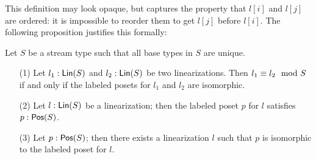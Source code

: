 This definition may look opaque, but captures the property that $l[i]$ and $l[j]$ are ordered: it is impossible to reorder them to get $l[j]$ before $l[i]$. The following proposition justifies this formally:
\begin{proposition}
\label{prop:lin-poset-correspondence}
Let $S$ be a stream type such that all base types in $S$ are unique.
\begin{enumerate}
\item[(1)] Let $l_1: \mathsf{Lin}({S})$ and $l_2: \mathsf{Lin}({S})$ be two linearizations.
Then $l_1 \equiv l_2 \mod {S}$ if and only if the labeled posets for $l_1$
and $l_2$ are isomorphic.
\item[(2)] Let $l: \mathsf{Lin}({S})$ be a linearization; then the labeled poset $p$ for $l$ satisfies $p: \mathsf{Pos}({S})$.
\item[(3)] Let $p: \mathsf{Pos}({S})$; then there exists a linearization $l$ such that $p$ is isomorphic to the labeled poset for $l$.
\end{enumerate}
\end{proposition}
